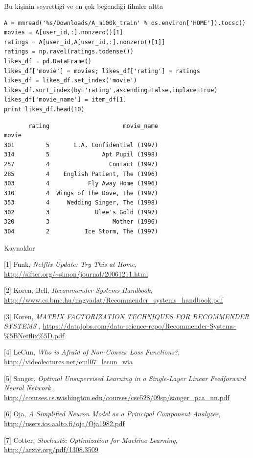 \documentclass[12pt,fleqn]{article}\usepackage{../../common}
\begin{document}
Bu kişinin seyrettiği ve en çok beğendiği filmler altta

\begin{verbatim}
A = mmread('%s/Downloads/A_m100k_train' % os.environ['HOME']).tocsc()
movies = A[user_id,:].nonzero()[1]
ratings = A[user_id,A[user_id,:].nonzero()[1]]
ratings = np.ravel(ratings.todense())
likes_df = pd.DataFrame()
likes_df['movie'] = movies; likes_df['rating'] = ratings
likes_df = likes_df.set_index('movie')
likes_df.sort_index(by='rating',ascending=False,inplace=True)
likes_df['movie_name'] = item_df[1]
print likes_df.head(10)
\end{verbatim}

\begin{verbatim}
       rating                     movie_name
movie                                       
301         5       L.A. Confidential (1997)
314         5               Apt Pupil (1998)
257         4                 Contact (1997)
285         4    English Patient, The (1996)
303         4           Fly Away Home (1996)
310         4  Wings of the Dove, The (1997)
353         4     Wedding Singer, The (1998)
302         3             Ulee's Gold (1997)
320         3                  Mother (1996)
304         2          Ice Storm, The (1997)
\end{verbatim}

Kaynaklar

[1] Funk, {\em Netflix Update: Try This at Home},
    \url{http://sifter.org/~simon/journal/20061211.html}

[2] Koren, Bell, {\em Recommender Systems Handbook},
    \url{http://www.cs.bme.hu/nagyadat/Recommender_systems_handbook.pdf}

[3] Koren, {\em MATRIX FACTORIZATION TECHNIQUES FOR RECOMMENDER SYSTEMS },
    \url{https://datajobs.com/data-science-repo/Recommender-Systems-%5BNetflix%5D.pdf}

[4] LeCun, {\em Who is Afraid of Non-Convex Loss Functions?},
    \url{http://videolectures.net/eml07_lecun_wia}

[5] Sanger, {\em Optimal Unsupervised Learning in a Single-Layer Linear  Feedforward Neural Network },
    \url{http://courses.cs.washington.edu/courses/cse528/09sp/sanger_pca_nn.pdf} %

[6] Oja, {\em A Simplified Neuron Model as a Principal Component Analyzer},
    \url{http://users.ics.aalto.fi/oja/Oja1982.pdf}

[7] Cotter, {\em Stochastic Optimization for Machine Learning},
    \url{http://arxiv.org/pdf/1308.3509}
\end{document}

